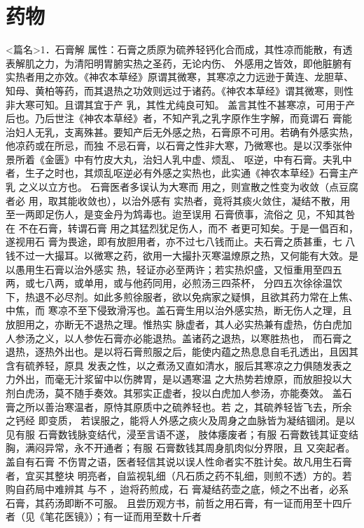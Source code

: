 \documentclass[a4paper,12pt,UTF8,twoside]{ctexbook}
\begin{document}
\part{药物}
<篇名>1．石膏解
属性：石膏之质原为硫养轻钙化合而成，其性凉而能散，有透表解肌之力，为清阳明胃腑实热之圣药，无论内伤、 
外感用之皆效，即他脏腑有实热者用之亦效。《神农本草经》原谓其微寒，其寒凉之力远逊于黄连、龙胆草、 
知母、黄柏等药，而其退热之功效则远过于诸药。《神农本草经》谓其微寒，则性非大寒可知。且谓其宜于产 
乳，其性尤纯良可知。 
盖言其性不甚寒凉，可用于产后也。乃后世注《神农本草经》者，不知产乳之乳字原作生字解，而竟谓石 
膏能治妇人无乳，支离殊甚。要知产后无外感之热，石膏原不可用。若确有外感实热，他凉药或在所忌，而独 
不忌石膏，以石膏之性非大寒，乃微寒也。是以汉季张仲景所着《金匮》中有竹皮大丸，治妇人乳中虚、烦乱、 
呕逆，中有石膏。夫乳中者，生子之时也，其烦乱呕逆必有外感之实热也，此实通《神农本草经》石膏主产乳 
之义以立方也。 
石膏医者多误认为大寒而 用之，则宣散之性变为收敛（点豆腐者必 用，取其能收敛也），以治外感有 
实热者，竟将其痰火敛住，凝结不散，用至一两即足伤人，是变金丹为鸩毒也。迨至误用 石膏偾事，流俗之 
见，不知其咎在 不在石膏，转谓石膏 用之其猛烈犹足伤人，而不 者更可知矣。于是一倡百和，遂视用石 
膏为畏途，即有放胆用者，亦不过七八钱而止。夫石膏之质甚重，七 
八钱不过一大撮耳。以微寒之药，欲用一大撮扑灭寒温燎原之热，又何能有大效。是以愚用生石膏以治外感实 
热，轻证亦必至两许；若实热炽盛，又恒重用至四五两，或七八两，或单用，或与他药同用，必煎汤三四茶杯， 
分四五次徐徐温饮下，热退不必尽剂。如此多煎徐服者，欲以免病家之疑惧，且欲其药力常在上焦、中焦，而 
寒凉不至下侵致滑泻也。盖石膏生用以治外感实热，断无伤人之理，且放胆用之，亦断无不退热之理。惟热实 
脉虚者，其人必实热兼有虚热，仿白虎加人参汤之义，以人参佐石膏亦必能退热。盖诸药之退热，以寒胜热也， 
而石膏之退热，逐热外出也。是以将石膏煎服之后，能使内蕴之热息息自毛孔透出，且因其含有硫养轻，原具 
发表之性，以之煮汤又直如清水，服后其寒凉之力俱随发表之力外出，而毫无汁浆留中以伤脾胃，是以遇寒温 
之大热势若燎原，而放胆投以大剂白虎汤，莫不随手奏效。其邪实正虚者，投以白虎加人参汤，亦能奏效。 
盖石膏之所以善治寒温者，原恃其原质中之硫养轻也。若 之，其硫养轻皆飞去，所余之钙经 即变质， 
若误服之，能将人外感之痰火及周身之血脉皆为凝结锢闭。是以见有服 石膏数钱脉变结代，浸至言语不遂， 
肢体痿废者；有服 石膏数钱其证变结胸，满闷异常，永不开通者；有服 石膏数钱其周身肌肉似分界限，且 
又突起者。盖自有石膏 不伤胃之语，医者轻信其说以误人性命者实不胜计矣。故凡用生石膏者，宜买其整块 
明亮者，自监视轧细（凡石质之药不轧细，则煎不透）方的。若购自药局中难辨其 与不 ，迨将药煎成，石 
膏凝结药壶之底，倾之不出者，必系 石膏，其药汤即断不可服。 
且尝历观方书，前哲之用石膏，有一证而用至十四斤者（见《笔花医镜》）；有一证而用至数十斤者 
\end{document}
